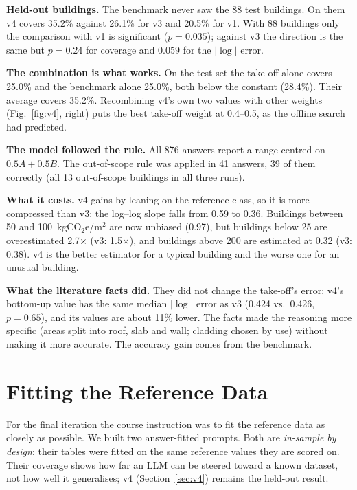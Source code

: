 \documentclass[10pt,letterpaper]{article}
\newcommand{\coe}{kgCO$_2$e/m$^2$}
\begin{document}
\textbf{Held-out buildings.} The benchmark never saw the 88 test buildings. On them v4 covers 35.2\% against 26.1\% for v3 and 20.5\% for v1. With 88 buildings only the comparison with v1 is significant ($p=0.035$); against v3 the direction is the same but $p=0.24$ for coverage and $0.059$ for the $|\log|$ error.

\textbf{The combination is what works.} On the test set the take-off alone covers 25.0\% and the benchmark alone 25.0\%, both below the constant (28.4\%). Their average covers 35.2\%. Recombining v4's own two values with other weights (Fig.~\ref{fig:v4}, right) puts the best take-off weight at 0.4--0.5, as the offline search had predicted.

\textbf{The model followed the rule.} All 876 answers report a range centred on $0.5A+0.5B$. The out-of-scope rule was applied in 41 answers, 39 of them correctly (all 13 out-of-scope buildings in all three runs).

\textbf{What it costs.} v4 gains by leaning on the reference class, so it is more compressed than v3: the log--log slope falls from 0.59 to 0.36. Buildings between 50 and 100~\coe{} are now unbiased (0.97), but buildings below 25 are overestimated 2.7$\times$ (v3: 1.5$\times$), and buildings above 200 are estimated at 0.32 (v3: 0.38). v4 is the better estimator for a typical building and the worse one for an unusual building.

\textbf{What the literature facts did.} They did not change the take-off's error: v4's bottom-up value has the same median $|\log|$ error as v3 (0.424 vs.\ 0.426, $p=0.65$), and its values are about 11\% lower. The facts made the reasoning more specific (areas split into roof, slab and wall; cladding chosen by use) without making it more accurate. The accuracy gain comes from the benchmark.

\section{Fitting the Reference Data}
\label{sec:fit}
For the final iteration the course instruction was to fit the reference data as closely as possible. We built two answer-fitted prompts. Both are \emph{in-sample by design}: their tables were fitted on the same reference values they are scored on. Their coverage shows how far an LLM can be steered toward a known dataset, not how well it generalises; v4 (Section~\ref{sec:v4}) remains the held-out result.
\end{document}
